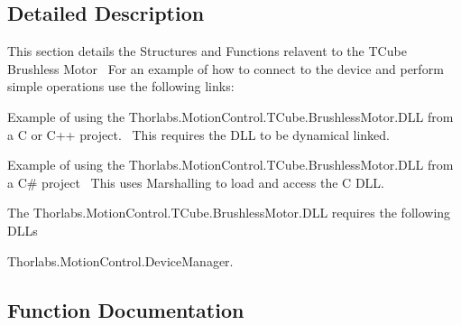 

\subsection{Detailed Description}
This section details the Structures and Functions relavent to the T\+Cube Brushless Motor~\newline
 For an example of how to connect to the device and perform simple operations use the following links\+: 
\begin{DoxyItemize}
\item Example of using the Thorlabs.Motion\+Control.T\+Cube.Brushless\+Motor.D\+LL from a C or C++ project.~\newline
 This requires the D\+LL to be dynamical linked.  
\item Example of using the Thorlabs.Motion\+Control.T\+Cube.Brushless\+Motor.D\+LL from a C\# project~\newline
 This uses Marshalling to load and access the C D\+LL.  
\end{DoxyItemize}The Thorlabs.\+Motion\+Control.\+T\+Cube.\+Brushless\+Motor.\+D\+LL requires the following D\+L\+Ls 
\begin{DoxyItemize}
\item Thorlabs.\+Motion\+Control.\+Device\+Manager.  
\end{DoxyItemize}

\subsection{Function Documentation}
